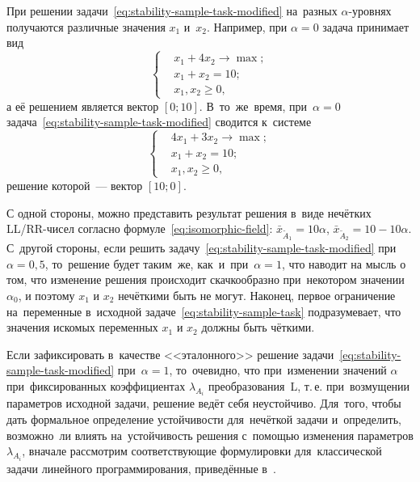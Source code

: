 При решении задачи~\eqref{eq:stability-sample-task-modified} на~разных $\alpha$-уровнях получаются различные значения $x_1$ и~$x_2$. Например, при $\alpha=0$ задача принимает вид
\begin{equation*}
  \left\{ \begin{aligned}
    & x_1+4x_2 \to \max; \\
    & x_1 + x_2 = 10; \\
    & x_1, x_2 \geqslant 0,
  \end{aligned} \right.
\end{equation*}
а её решением является вектор $\left[0;10 \right]$. В~то~же~время, при~$\alpha=0$ задача~\eqref{eq:stability-sample-task-modified} сводится к~системе
\begin{equation*}
  \left\{ \begin{aligned}
    & 4x_1+3x_2 \to \max; \\
    & x_1 + x_2 = 10; \\
    & x_1, x_2 \geqslant 0,
  \end{aligned} \right.
\end{equation*}
решение которой~--- вектор $\left[10;0 \right]$.

С одной стороны, можно представить результат решения в~виде нечётких LL/RR-чисел согласно формуле~\eqref{eq:isomorphic-field}:  $\bar{x}_{\tilde A_1}=10\alpha$, $\bar{x}_{\tilde A_2}=10-10\alpha$. С~другой стороны, если решить задачу~\eqref{eq:stability-sample-task-modified} при~$\alpha=0,5$, то~решение будет таким~же, как~и~при~$\alpha=1$, что наводит на мысль о том, что изменение решения происходит скачкообразно при~некотором значении $\alpha_0$, и поэтому $x_1$ и $x_2$ нечёткими быть не могут. Наконец, первое ограничение на~переменные в~исходной задаче~\eqref{eq:stability-sample-task} подразумевает, что значения искомых переменных $x_1$ и $x_2$ должны быть чёткими.

Если зафиксировать в~качестве <<эталонного>> решение задачи~\eqref{eq:stability-sample-task-modified} при~$\alpha=1$, то~очевидно, что при~изменении значений $\alpha$ при~фиксированных коэффициентах $\lambda_{A_i}$ преобразования~L, т.\,е. при~возмущении параметров исходной задачи, решение ведёт себя неустойчиво. Для~того, чтобы дать формальное определение устойчивости для~нечёткой задачи и~определить, возможно~ли влиять на~устойчивость решения с~помощью изменения параметров $\lambda_{A_i}$, вначале рассмотрим соответствующие формулировки для~классической задачи линейного программирования, приведённые в~\cite{Ashmanov}.

